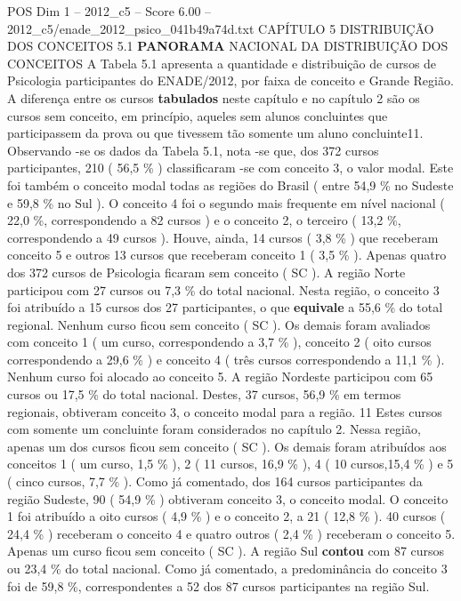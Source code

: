 \begin{textsample}{POS Dim 1 – 2012\_c5 – Score 6.00 – 2012\_c5/enade\_2012\_psico\_041b49a74d.txt}  \label{ex:f1_pos_116}
CAPÍTULO 5 DISTRIBUIÇÃO DOS CONCEITOS 5.1 \textbf{PANORAMA} NACIONAL DA DISTRIBUIÇÃO DOS CONCEITOS A Tabela 5.1 apresenta a quantidade e distribuição de cursos de Psicologia participantes do ENADE/2012, por faixa de conceito e Grande Região.
A diferença entre os cursos \textbf{tabulados} neste capítulo e no capítulo 2 são os cursos sem conceito, em princípio, aqueles sem alunos concluintes que participassem da prova ou que tivessem tão somente um aluno concluinte11.
Observando -se os dados da Tabela 5.1, nota -se que, dos 372 cursos participantes, 210 ( 56,5 \% ) classificaram -se com conceito 3, o valor modal.
Este foi também o conceito modal todas as regiões do Brasil ( entre 54,9 \% no Sudeste e 59,8 \% no Sul ).
O conceito 4 foi o segundo mais frequente em nível nacional ( 22,0 \%, correspondendo a 82 cursos ) e o conceito 2, o terceiro ( 13,2 \%, correspondendo a 49 cursos ).
Houve, ainda, 14 cursos ( 3,8 \% ) que receberam conceito 5 e outros 13 cursos que receberam conceito 1 ( 3,5 \% ).
Apenas quatro dos 372 cursos de Psicologia ficaram sem conceito ( SC ).
A região Norte participou com 27 cursos ou 7,3 \% do total nacional.
Nesta região, o conceito 3 foi atribuído a 15 cursos dos 27 participantes, o que \textbf{equivale} a 55,6 \% do total regional.
Nenhum curso ficou sem conceito ( SC ).
Os demais foram avaliados com conceito 1 ( um curso, correspondendo a 3,7 \% ), conceito 2 ( oito cursos correspondendo a 29,6 \% ) e conceito 4 ( três cursos correspondendo a 11,1 \% ).
Nenhum curso foi alocado ao conceito 5.
A região Nordeste participou com 65 cursos ou 17,5 \% do total nacional.
Destes, 37 cursos, 56,9 \% em termos regionais, obtiveram conceito 3, o conceito modal para a região. 11 Estes cursos com somente um concluinte foram considerados no capítulo 2.
Nessa região, apenas um dos cursos ficou sem conceito ( SC ).
Os demais foram atribuídos aos conceitos 1 ( um curso, 1,5 \% ), 2 ( 11 cursos, 16,9 \% ), 4 ( 10 cursos,15,4 \% ) e 5 ( cinco cursos, 7,7 \% ).
Como já comentado, dos 164 cursos participantes da região Sudeste, 90 ( 54,9 \% ) obtiveram conceito 3, o conceito modal.
O conceito 1 foi atribuído a oito cursos ( 4,9 \% ) e o conceito 2, a 21 ( 12,8 \% ). 40 cursos ( 24,4 \% ) receberam o conceito 4 e quatro outros ( 2,4 \% ) receberam o conceito 5.
Apenas um curso ficou sem conceito ( SC ).
A região Sul \textbf{contou} com 87 cursos ou 23,4 \% do total nacional.
Como já comentado, a predominância do conceito 3 foi de 59,8 \%, correspondentes a 52 dos 87 cursos participantes na região Sul.

\end{textsample}
